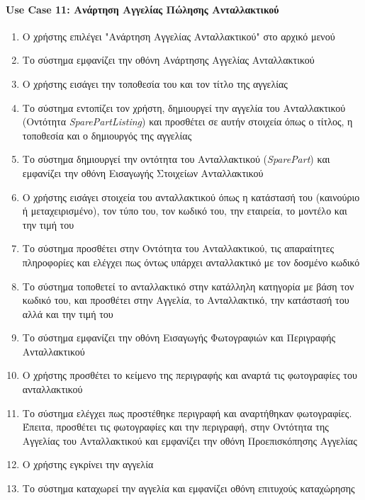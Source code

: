 \documentclass{../ol-softwaremanual}
\begin{document}
	
	
	\paragraph{\en Use Case 11: \gr Ανάρτηση Αγγελίας Πώλησης Ανταλλακτικού \gr}
	
	\begin{enumerate}
		\item Ο χρήστης επιλέγει \en"\gr Ανάρτηση Αγγελίας Ανταλλακτικού\en" \gr στο αρχικό μενού
		\item Το σύστημα εμφανίζει την οθόνη Ανάρτησης Αγγελίας Ανταλλακτικού
		\item Ο χρήστης εισάγει την τοποθεσία του και τον τίτλο της αγγελίας		
		\item Το σύστημα εντοπίζει τον χρήστη, δημιουργεί την αγγελία του Ανταλλακτικού (Οντότητα \en\textit{SparePartListing}\gr) και προσθέτει σε αυτήν στοιχεία όπως ο τίτλος, η τοποθεσία και ο δημιουργός της αγγελίας
		\item Το σύστημα δημιουργεί την οντότητα του Ανταλλακτικού (\en \textit{SparePart}\gr) και εμφανίζει την οθόνη Εισαγωγής Στοιχείων Ανταλλακτικού		
		\item Ο χρήστης εισάγει στοιχεία του ανταλλακτικού όπως η κατάστασή του (καινούριο ή μεταχειρισμένο), τον τύπο του, τον κωδικό του, την εταιρεία, το μοντέλο και την τιμή του		
		\item Το σύστημα προσθέτει στην Οντότητα του Ανταλλακτικού, τις απαραίτητες πληροφορίες και ελέγχει πως όντως υπάρχει ανταλλακτικό με τον δοσμένο κωδικό		
		\item Το σύστημα τοποθετεί το ανταλλακτικό στην κατάλληλη κατηγορία με βάση τον κωδικό του, και προσθέτει στην Αγγελία, το Ανταλλακτικό, την κατάστασή του αλλά και την τιμή του
		\item Το σύστημα εμφανίζει την οθόνη Εισαγωγής Φωτογραφιών και Περιγραφής Ανταλλακτικού		
		\item Ο χρήστης προσθέτει το κείμενο της περιγραφής και αναρτά τις φωτογραφίες του ανταλλακτικού		
		\item Το σύστημα ελέγχει πως προστέθηκε περιγραφή και αναρτήθηκαν φωτογραφίες. Έπειτα, προσθέτει τις φωτογραφίες και την περιγραφή, στην Οντότητα της Αγγελίας του Ανταλλακτικού και εμφανίζει την οθόνη Προεπισκόπησης Αγγελίας
		\item Ο χρήστης εγκρίνει την αγγελία		
		\item Το σύστημα καταχωρεί την αγγελία και εμφανίζει οθόνη επιτυχούς καταχώρησης
	\end{enumerate}
	
\end{document}
